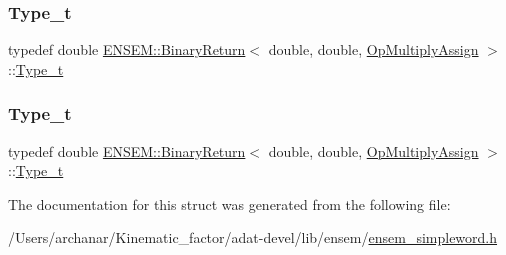 \mbox{\label{structENSEM_1_1BinaryReturn_3_01double_00_01double_00_01OpMultiplyAssign_01_4_a68d7326bd6a61910b02ec674e3a92f01}} 
\subsubsection{\texorpdfstring{Type\_t}{Type\_t}\hspace{0.1cm}{\footnotesize\ttfamily [2/3]}}
{\footnotesize\ttfamily typedef double \mbox{\hyperlink{structENSEM_1_1BinaryReturn}{E\+N\+S\+E\+M\+::\+Binary\+Return}}$<$ double, double, \mbox{\hyperlink{structENSEM_1_1OpMultiplyAssign}{Op\+Multiply\+Assign}} $>$\+::\mbox{\hyperlink{structENSEM_1_1BinaryReturn_3_01double_00_01double_00_01OpMultiplyAssign_01_4_a68d7326bd6a61910b02ec674e3a92f01}{Type\+\_\+t}}}

\mbox{\label{structENSEM_1_1BinaryReturn_3_01double_00_01double_00_01OpMultiplyAssign_01_4_a68d7326bd6a61910b02ec674e3a92f01}} 
\subsubsection{\texorpdfstring{Type\_t}{Type\_t}\hspace{0.1cm}{\footnotesize\ttfamily [3/3]}}
{\footnotesize\ttfamily typedef double \mbox{\hyperlink{structENSEM_1_1BinaryReturn}{E\+N\+S\+E\+M\+::\+Binary\+Return}}$<$ double, double, \mbox{\hyperlink{structENSEM_1_1OpMultiplyAssign}{Op\+Multiply\+Assign}} $>$\+::\mbox{\hyperlink{structENSEM_1_1BinaryReturn_3_01double_00_01double_00_01OpMultiplyAssign_01_4_a68d7326bd6a61910b02ec674e3a92f01}{Type\+\_\+t}}}



The documentation for this struct was generated from the following file\+:\begin{DoxyCompactItemize}
\item 
/\+Users/archanar/\+Kinematic\+\_\+factor/adat-\/devel/lib/ensem/\mbox{\hyperlink{adat-devel_2lib_2ensem_2ensem__simpleword_8h}{ensem\+\_\+simpleword.\+h}}\end{DoxyCompactItemize}
